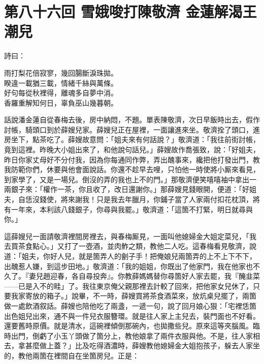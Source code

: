 
\chapter*{第八十六回 雪娥唆打陳敬濟 金蓮解渴王潮兒}


詩曰：

\begin{myquote}
雨打梨花倍寂寥，幾回腸斷淚珠拋。\\睽違一載猶三載，情緒千絲與萬條。\\好句每從秋裡得，離魂多自夢中消。\\香羅重解知何日，辜負巫山幾暮朝。
\end{myquote}

話說潘金蓮自從春梅去後，房中納悶，不題。單表陳敬濟，次日早飯時出去，假作討帳，騎頭口到於薛嫂兒家。薛嫂兒正在屋裡，一面讓進來坐。敬濟拴了頭口，進房坐下，點茶吃了。薛嫂故意問：「姐夫來有何話說？」敬濟道：「我往前街討帳，竟到這裡。昨晚大小姐出來了，和他說句話兒。」薛嫂故作喬張致，{}說：「好姐夫，昨日你家丈母好不分付我，因為你每通同作弊，弄出醜事來，纔把他打發出門，教我防範你們，休要與他會面說話。你還不趁早去哩，只怕他一時使將小厮來看見，到家學了，又是一場兒。倒沒的弄的我也上不的門。」那敬濟便笑嘻嘻袖中拿出一兩銀子來：「權作一茶，你且收了，改日還謝你。」那薛嫂見錢眼開，便道：「好姐夫，自恁沒錢使，將來謝我！只是我去年臘月，你鋪子當了人家兩付扣花枕頂，將有一年來，本利該八錢銀子，你尋與我罷。」{}敬濟道：「這箇不打緊，明日就尋與你。」

這薛嫂兒一面請敬濟裡間房裡去，與春梅厮見，一面叫他媳婦金大姐定菜兒，「我去買茶食點心。」又打了一壺酒，並肉鮓之類，教他二人吃。這春梅看見敬濟，說道：「姐夫，你好人兒，就是箇弄人的劊子手！把俺娘兒兩箇弄的上不上下不下，出醜惹人嫌，到這步田地。」{}敬濟道：「我的姐姐，你既出了他家門，我在他家也不久了。『妻兒趙迎春，各自尋投奔』。你教薛媽媽替你尋箇好人家去罷，我『醃韭菜——已是入不的畦」了。我往東京俺父親那裡去計較了回來，把他家女兒休了，只要我家寄放的箱子。」說畢，不一時，薛嫂買將茶食酒菜來，放炕桌兒擺了，兩箇做一處飲酒叙話。薛嫂也陪他吃了兩盞，一遞一句，說了回月娘心狠：「宅裡恁箇出色姐兒出來，通不與一件兒衣服簪環。就是往人家上主兒去，裝門面也不好看。還要舊時原價。就是清水，這碗裡傾倒那碗內，也拋撒些兒。原來這等夾腦風。臨時出門，倒虧了小玉丫頭做了箇分上，教他娘拿了兩件衣服與他。不是，往人家相去，拿甚麼做上蓋？」比及吃得酒濃時，薛嫂教他媳婦金大姐抱孩子，躲去人家坐的，教他兩箇在裡間自在坐箇房兒。{}正是：


